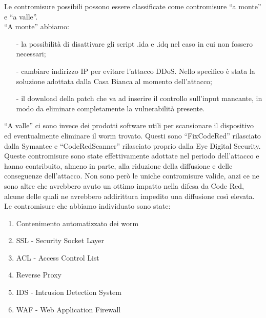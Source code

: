 Le contromisure possibili possono essere classificate come contromisure “a monte” e “a valle”.\\
“A monte” abbiamo:
\begin{itemize}
\item[-] la possibilità di disattivare gli script .ida e .idq nel caso in cui non fossero necessari;
\item[-] cambiare indirizzo IP per evitare l’attacco DDoS. Nello specifico è stata la soluzione adottata dalla Casa Bianca al momento dell’attacco;
\item[-] il download della patch che va ad inserire il controllo sull’input mancante, in modo da eliminare completamente la vulnerabilità presente.
\end{itemize}
“A valle” ci sono invece dei prodotti software utili per scansionare il dispositivo ed eventualmente eliminare il worm trovato. Questi sono “FixCodeRed” rilasciato dalla Symantec e “CodeRedScanner” rilasciato proprio dalla Eye Digital Security.\\
Queste contromisure sono state effettivamente adottate nel periodo dell’attacco e hanno contribuito, almeno in parte, alla riduzione della diffusione e delle conseguenze dell’attacco. Non sono però le uniche contromisure valide, anzi ce ne sono altre che avrebbero avuto un ottimo impatto nella difesa da Code Red, alcune delle quali ne avrebbero addirittura impedito una diffusione così elevata.\\
Le contromisure che abbiamo individuato sono state:
\begin{enumerate}
\item Contenimento automatizzato dei worm
\item SSL - Security Socket Layer
\item ACL - Access Control List
\item Reverse Proxy
\item IDS - Intrusion Detection System
\item WAF - Web Application Firewall
\end{enumerate}
